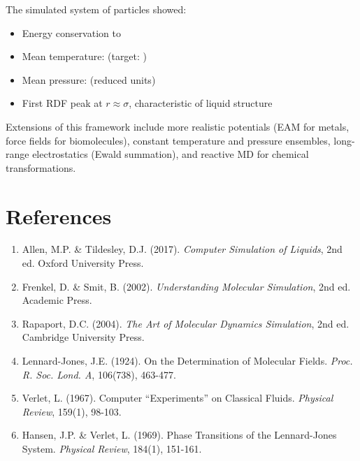 \documentclass[11pt,a4paper]{article}
\begin{document}
The simulated system of  particles showed:
\begin{itemize}
    \item Energy conservation to 
    \item Mean temperature:  (target: )
    \item Mean pressure:  (reduced units)
    \item First RDF peak at $r \approx \sigma$, characteristic of liquid structure
\end{itemize}

Extensions of this framework include more realistic potentials (EAM for metals, force fields for biomolecules), constant temperature and pressure ensembles, long-range electrostatics (Ewald summation), and reactive MD for chemical transformations.

\section{References}

\begin{enumerate}
    \item Allen, M.P. \& Tildesley, D.J. (2017). \textit{Computer Simulation of Liquids}, 2nd ed. Oxford University Press.

    \item Frenkel, D. \& Smit, B. (2002). \textit{Understanding Molecular Simulation}, 2nd ed. Academic Press.

    \item Rapaport, D.C. (2004). \textit{The Art of Molecular Dynamics Simulation}, 2nd ed. Cambridge University Press.

    \item Lennard-Jones, J.E. (1924). On the Determination of Molecular Fields. \textit{Proc. R. Soc. Lond. A}, 106(738), 463-477.

    \item Verlet, L. (1967). Computer ``Experiments'' on Classical Fluids. \textit{Physical Review}, 159(1), 98-103.

    \item Hansen, J.P. \& Verlet, L. (1969). Phase Transitions of the Lennard-Jones System. \textit{Physical Review}, 184(1), 151-161.
\end{enumerate}
\end{document}
